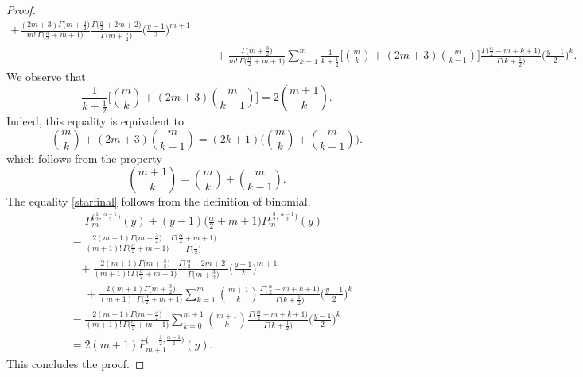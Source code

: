 \documentclass[reqno,11pt]{amsart}
\theoremstyle{definition}
\begin{document}
\begin{proof}
\begin{align*}
	+\frac{(2m+3)\Gamma \big(m+\frac{3}{2}\big)}{m!\, \Gamma \big(\frac{\alpha}{2}+m+1\big)} \frac{\Gamma \big(\frac{\alpha}{2}+2m+2\big)}{\Gamma\big(m+\frac{5}{2}\big)}\bigg(\frac{y-1}{2}\bigg)^{m+1}\\
	&\phantom{=}+
	\frac{\Gamma \big(m+\frac{3}{2}\big)}{m!\, \Gamma \big(\frac{\alpha}{2}+m+1\big)}  \sum_{k=1}^{m} \frac{1}{k+\frac{1}{2}}\bigg[\binom{m}{k}+(2m+3) \binom{m}{k-1}\bigg] \frac{\Gamma\big(\frac{\alpha}{2}+m+k+1\big)}{\Gamma \big(k+\frac{1}{2}\big)} \bigg(\frac{y-1}{2}\bigg)^k.
\end{align*}
\endgroup
We observe that
\begin{equation}
\label{starfinal}
\frac{1}{k+\frac{1}{2}}\bigg[\binom{m}{k}+(2m+3) \binom{m}{k-1}\bigg] = 2\binom{m+1}{k}.
\end{equation}
Indeed, this equality is equivalent to
\[
\binom{m}{k}+(2m+3) \binom{m}{k-1} = (2k+1)\bigg( \binom{m}{k}+\binom{m}{k-1}\bigg).
\]
which follows from the property
$$\binom{m+1}{k}=\binom{m}{k}+\binom{m}{k-1}.
$$
The equality \eqref{starfinal} follows from the definition of binomial.
\begin{align*}
	&\phantom{=}P_m^{\big(\frac{1}{2},\frac{\alpha-1}{2}\big)}(y)+(y-1)\Big(\frac{\alpha}{2}+m+1\Big)P_m^{\big(\frac{3}{2}, \frac{\alpha-1}{2}\big)}(y)\\
	&=\frac{2(m+1)\Gamma \big(m+\frac{3}{2}\big)}{(m+1)!\, \Gamma \big(\frac{\alpha}{2}+m+1\big)} \frac{\Gamma \big(\frac{\alpha}{2}+m+1\big)}{\Gamma\big(\frac{1}{2}\big)}\\
	& \, \, \, \, \,  +\frac{2(m+1)\Gamma \big(m+\frac{3}{2}\big)}{(m+1)!\, \Gamma \big(\frac{\alpha}{2}+m+1\big)} \frac{\Gamma \big(\frac{\alpha}{2}+2m+2\big)}{\Gamma\big(m+\frac{3}{2}\big)}\bigg(\frac{y-1}{2}\bigg)^{m+1}\\
	&\phantom{=}+
	\frac{2(m+1)\Gamma \big(m+\frac{3}{2}\big)}{(m+1)!\, \Gamma \big(\frac{\alpha}{2}+m+1\big)}  \sum_{k=1}^{m} \binom{m+1}{k} \frac{\Gamma\big(\frac{\alpha}{2}+m+k+1\big)}{\Gamma \big(k+\frac{1}{2}\big)} \bigg(\frac{y-1}{2}\bigg)^k \\
	&=\frac{2(m+1)\Gamma \big(m+\frac{3}{2}\big)}{(m+1)!\, \Gamma \big(\frac{\alpha}{2}+m+1\big)}  \sum_{k=0}^{m+1} \binom{m+1}{k} \frac{\Gamma\big(\frac{\alpha}{2}+m+k+1\big)}{\Gamma \big(k+\frac{1}{2}\big)} \bigg(\frac{y-1}{2}\bigg)^k\\
	& =2(m+1)P_{m+1}^{\big(-\frac{1}{2}, \frac{\alpha-1}{2}\big)}(y).
\end{align*}
This concludes the proof.
\end{proof}
\end{document}
